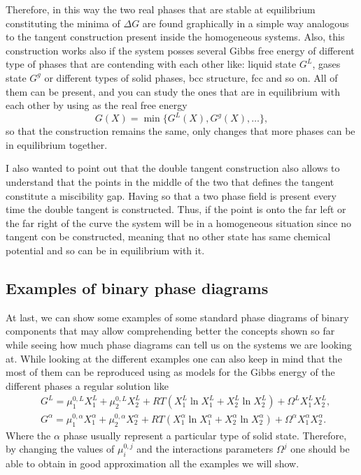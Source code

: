 \noindent
Therefore, in this way the two real phases that are stable at equilibrium constituting the minima of $\Delta G$ are found graphically in a simple way analogous to the tangent construction present inside the homogeneous systems. Also, this construction works also if the system posses several Gibbs free energy of different type of phases that are contending with each other like: liquid state $G^L$, gases state $G^g$ or different types of solid phases, bcc structure, fcc and so on. All of them can be present, and you can study the ones that are in equilibrium with each other by using as the real free energy
\begin{equation}
    G(X) = \min\{ G^L(X), G^g(X), \dots \},
\end{equation}
so that the construction remains the same, only changes that more phases can be in equilibrium together.

\nt
{
    I also wanted to point out that the double tangent construction also allows to understand that the points in the middle of the two that defines the tangent constitute a miscibility gap. Having so that a two phase field is present every time the double tangent is constructed. Thus, if the point is onto the far left or the far right of the curve the system will be in a homogeneous situation since no tangent con be constructed, meaning that no other state has same chemical potential and so can be in equilibrium with it.
}


\subsection{Examples of binary phase diagrams}

At last, we can show some examples of some standard phase diagrams of binary components that may allow comprehending better the concepts shown so far while seeing how much phase diagrams can tell us on the systems we are looking at. While looking at the different examples one can also keep in mind that the most of them can be reproduced using as models for the Gibbs energy of the different phases a regular solution like
\begin{align}
    &G^L = \mu^{0,L}_1 X_1^L + \mu^{0,L}_2 X_2^L + RT(X_1^L\ln X_1^L + X_2^L\ln X_2^L) + \Omega^L X_1^LX_2^L,\\
    &G^\alpha = \mu^{0,\alpha}_1 X_1^\alpha + \mu^{0,\alpha}_2 X_2^\alpha + RT(X_1^\alpha\ln X_1^\alpha + X_2^\alpha\ln X_2^\alpha) + \Omega^\alpha X_1^\alpha X_2^\alpha.
\end{align}
Where the $\alpha$ phase usually represent a particular type of solid state. Therefore, by changing the values of $\mu_i^{0,j}$ and the interactions parameters $\Omega^j$ one should be able to obtain in good approximation all the examples we will show.

